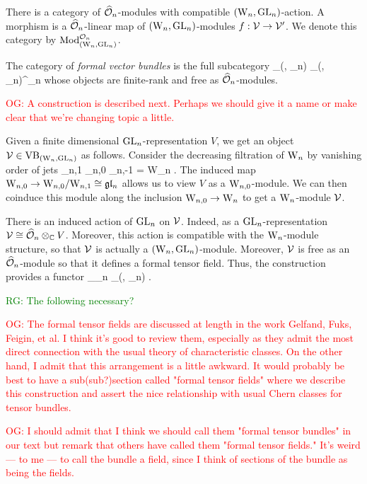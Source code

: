 \documentclass[10pt]{amsart}
\def\owen{\textcolor{red}{OG: }\textcolor{red}}
\def\ryan{\textcolor{green}{RG: }\textcolor{green}}
\begin{document}
There is a category of $\widehat{\mathcal O}_n$-modules with compatible $({{\rm W}_n}, {\rm GL}_n)$-action. A morphism is a $\widehat{\mathcal O}_n$-linear map of $({{\rm W}_n}, {\rm GL}_n)$-modules $f : \mathcal{V} \to \mathcal{V}'$. We denote this category by ${\rm Mod}_{({{\rm W}_n}, {\rm GL}_n)}^{\mathcal O_n}$. 

The category of {\em formal vector bundles} is the full subcategory
\ben
\VB_{(\Vect, \GL_n)} \subset \Mod_{(\Vect, \GL_n)}^{\cO_n}
\een
whose objects are finite-rank and free as $\widehat{\mathcal O}_n$-modules.

\owen{A construction is described next. Perhaps we should give it a name or make clear that we're changing topic a little.}

Given a finite dimensional ${\rm GL}_n$-representation $V$, we get an object $\mathcal{V} \in {\rm VB}_{({{\rm W}_n}, {\rm GL}_n)}$ as follows. Consider the decreasing filtration of ${{\rm W}_n}$ by vanishing order of jets 
\ben
\cdots {}_{n,1} _{n,0} _{n,-1} = {\rm W}_n .
\een 
The induced map ${\rm W}_{n,0} \to {\rm W}_{n,0} / {\rm W}_{n,1} \cong \mathfrak{g} \mathfrak{l}_n$ allows us to view $V$ as a ${\rm W}_{n,0}$-module. We can then coinduce this module along the inclusion ${\rm W}_{n,0} \to {\rm W}_n$ to get a ${\rm W}_n$-module $\mathcal{V}$. 

There is an induced action of ${\rm GL}_n$ on $\mathcal{V}$. Indeed, as a ${\rm GL}_n$-representation $\mathcal{V} \cong \widehat{\mathcal O}_n \otimes_{\mathbb C} V$.
Moreover, this action is compatible with the ${{\rm W}_n}$-module structure, so that $\mathcal{V}$ is actually a $({{\rm W}_n}, {\rm GL}_n)$-module. Moreover, $\mathcal{V}$ is free as an $\widehat{\mathcal O}_n$-module so that it defines a formal tensor field. Thus, the construction provides a functor
\ben
\Rep_{\GL_n} \to \VB_{(\Vect, \GL_n)} .
\een

\ryan{The following necessary?}

\owen{The formal tensor fields are discussed at length in the work Gelfand, Fuks, Feigin, et al. I think it's good to review them, especially as they admit the most direct connection with the usual theory of characteristic classes. On the other hand, I admit that this arrangement is a little awkward. It would probably be best to have a sub(sub?)section called "formal tensor fields" where we describe this construction and assert the nice relationship with usual Chern classes for tensor bundles.}

\owen{I should admit that I think we should call them "formal tensor bundles" in our text but remark that others have called them "formal tensor fields." It's weird --- to me --- to call the bundle a field, since I think of sections of the bundle as being the fields.}
\end{document}
